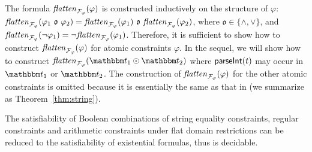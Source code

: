 
The formula $\mathit{flatten}_{\mathcal{F}_\varphi}(\varphi)$ is constructed inductively on the structure of $\varphi$: $\flatten_{\flatfun_\varphi}(\varphi_1\ \mathfrak{o}\ \varphi_2) = \flatten_{\flatfun_\varphi}(\varphi_1) \ \mathfrak{o}\  \flatten_{\flatfun_\varphi}(\varphi_2)$, where $\mathfrak{o} \in \{\wedge, \vee\}$, and $\mathit{flatten}_{\mathcal{F}_\varphi}(\neg \varphi_1) = \neg \mathit{flatten}_{\mathcal{F}_\varphi}(\varphi_1)$. Therefore, it is sufficient to show how to construct $\mathit{flatten}_{\mathcal{F}_\varphi}(\varphi)$ for atomic constraints $\varphi$. 
In the sequel, we will show how to construct $\flatten_{\flatfun_\varphi}(\iterm_1 \op \iterm_2)$ where $\textsf{parseInt}(t)$ may occur in $\iterm_1$ or $\iterm_2$. The construction of $\mathit{flatten}_{\mathcal{F}_\varphi}(\varphi)$ for the other atomic constraints is omitted because it is essentially the same as that in \cite{Parosh:20:PLDI} (we summarize as Theorem~\ref{thm:string}).

\begin{theorem}\label{thm:string}\cite{Parosh:20:PLDI} The satisfiability of Boolean combinations of string equality constraints, regular constraints and arithmetic constraints under flat domain restrictions can be reduced to the satisfiability of existential {\pa}   formulas, thus is decidable.
\end{theorem}

